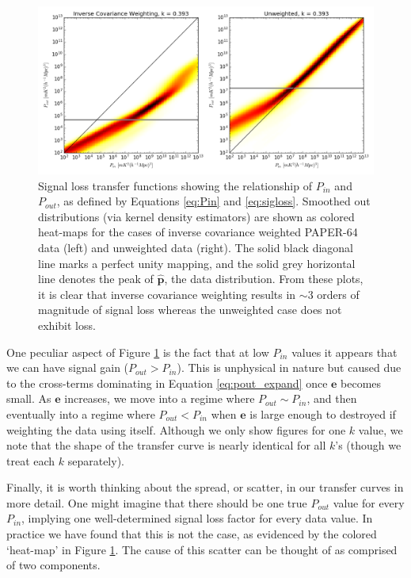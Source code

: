 \documentclass[preprint2,numberedappendix,tighten]{aastex6}  %
\begin{document}
\begin{figure}
	\centering
	\includegraphics[width=1\textwidth]{plots/sigloss_transfercurve.png}
	\caption{Signal loss transfer functions showing the relationship of $P_{in}$ and $P_{out}$, as defined by Equations \eqref{eq:Pin} and \eqref{eq:sigloss}. Smoothed out distributions (via kernel density estimators) are shown as colored heat-maps for the cases of inverse covariance weighted PAPER-64 data (left) and unweighted data (right). The solid black diagonal line marks a perfect unity mapping, and the solid grey horizontal line denotes the peak of $\hat{\textbf{p}}$, the data distribution. From these plots, it is clear that inverse covariance weighting results in $\sim3$ orders of magnitude of signal loss whereas the unweighted case does not exhibit loss.}
	\label{fig:sigloss_transfercurve}
\end{figure}

One peculiar aspect of Figure \ref{fig:sigloss_transfercurve} is the fact that at low $P_{in}$ values it appears that we can have signal gain ($P_{out} > P_{in}$). This is unphysical in nature but caused due to the cross-terms dominating in Equation \eqref{eq:pout_expand} once $\textbf{e}$ becomes small. As $\textbf{e}$ increases, we move into a regime where $P_{out} \sim P_{in}$, and then eventually into a regime where $P_{out} < P_{in}$ when $\textbf{e}$ is large enough to destroyed if weighting the data using itself. Although we only show figures for one $k$ value, we note that the shape of the transfer curve is nearly identical for all $k$'s (though we treat each $k$ separately).

Finally, it is worth thinking about the spread, or scatter, in our transfer curves in more detail. One might imagine that there should be one true $P_{out}$ value for every $P_{in}$, implying one well-determined signal loss factor for every data value. In practice we have found that this is not the case, as evidenced by the colored `heat-map' in Figure \ref{fig:sigloss_transfercurve}. The cause of this scatter can be thought of as comprised of two components. 
\end{document}
